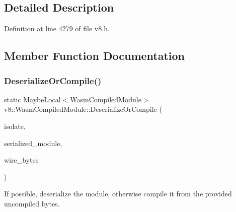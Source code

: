 \subsection{Detailed Description}


Definition at line 4279 of file v8.\+h.



\subsection{Member Function Documentation}
\mbox{\label{classv8_1_1WasmCompiledModule_abd5b90ef1d021e148c2fcb052a8651d4}} 
\subsubsection{\texorpdfstring{Deserialize\+Or\+Compile()}{DeserializeOrCompile()}}
{\footnotesize\ttfamily static \mbox{\hyperlink{classv8_1_1MaybeLocal}{Maybe\+Local}}$<$\mbox{\hyperlink{classv8_1_1WasmCompiledModule}{Wasm\+Compiled\+Module}}$>$ v8\+::\+Wasm\+Compiled\+Module\+::\+Deserialize\+Or\+Compile (\begin{DoxyParamCaption}\item[{Isolate $\ast$}]{isolate,  }\item[{\mbox{\hyperlink{structv8_1_1WasmCompiledModule_1_1BufferReference}{Buffer\+Reference}}}]{serialized\+\_\+module,  }\item[{\mbox{\hyperlink{structv8_1_1WasmCompiledModule_1_1BufferReference}{Buffer\+Reference}}}]{wire\+\_\+bytes }\end{DoxyParamCaption})\hspace{0.3cm}{\ttfamily [static]}}

If possible, deserialize the module, otherwise compile it from the provided uncompiled bytes. \mbox{\label{classv8_1_1WasmCompiledModule_a6bdfdf09e75ad1eb19d5b944e6177f74}} 
